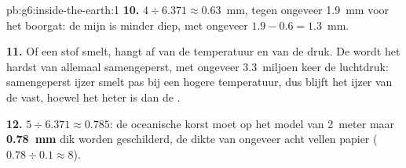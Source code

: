 \begin{solution}{pb:g6:inside-the-earth:1}
\textbf{10.} $4 \div 6.371 \approx 0.63$~mm, tegen ongeveer 1.9~mm voor het
boorgat: de mijn is minder diep, met ongeveer $1.9 - 0.6 = 1.3$~mm.

\textbf{11.} Of een stof smelt, hangt af van de temperatuur en van de druk.
De  wordt het hardst van allemaal samengeperst, met ongeveer
3.3~miljoen keer de luchtdruk: samengeperst ijzer smelt pas bij een hogere
temperatuur, dus blijft het ijzer van de  vast, hoewel het heter
is dan de .

\textbf{12.} $5 \div 6.371 \approx 0.785$: de oceanische korst moet op het
model van 2~meter maar \textbf{0.78~mm} dik worden geschilderd, de dikte
van ongeveer acht vellen papier ($0.78 \div 0.1 \approx 8$).
\end{solution}

